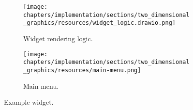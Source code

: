 \begin{figure}[!htb]
    \centering
    \begin{subfigure}{0.45\textwidth}
        \centering
        \texttt{[image: chapters/implementation/sections/two\_dimensional\_graphics/resources/widget\_logic.drawio.png]}
        \caption{Widget rendering logic.}
        \label{fig:widget_logic}
    \end{subfigure}
    \hfill
    \begin{subfigure}{0.45\textwidth}
        \centering
        \texttt{[image: chapters/implementation/sections/two\_dimensional\_graphics/resources/main-menu.png]}
        \caption{Main menu.}
        \label{fig:example_widget}
    \end{subfigure}

    \caption{Example widget.}
\end{figure}